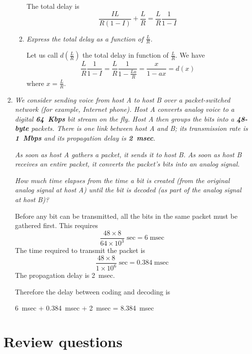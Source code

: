\documentclass[12pt,a4paper]{article}
\begin{document}
\begin{enumerate}
\begin{enumerate}
      The total delay is
      \[
        \frac{IL}{R(1-I)} + \frac{L}{R} = \frac{L}{R} \frac{1}{1-I}
      \]

      \item \emph{Express the total delay as a function of
        \(\frac{L}{R}\).}

      Let us call \(d (\frac{L}{R})\) the total delay in function of
      \(\frac{L}{R}\). We have
      \[
       \frac{L}{R} \frac{1}{1-I} = \frac{L}{R} \frac{1}{1 -
         \frac{La}{R}} = \frac{x}{1 - ax} = d (x)
      \]
      where \(x = \frac{L}{R}\).

    \end{enumerate}

  \item \emph{We consider sending voice from host A to host B over a
    packet-switched network (for example, Internet phone). Host A
    converts analog voice to a digital \textbf{64~Kbps} bit stream on
    the fly. Host A then groups the bits into a \textbf{48-byte}
    packets. There is one link between host A and B; its transmission
    rate is \textbf{1~Mbps} and its propagation delay is
    \textbf{2~msec}.}

    \emph{As soon as host A gathers a packet, it sends it to host
      B. As soon as host B receives an \emph{entire} packet, it
      converts the packet's bits into an analog signal.}

    \emph{How much time elapses from the time a bit is created (from
      the original analog signal at host A) until the bit is decoded
      (as part of the analog signal at host B)?}

    Before any bit can be transmitted, all the bits in the same packet
    must be gathered first. This requires
    \[
      \frac{48 \times 8}{64 \times 10^3} \; \text{sec} = 6 \;
      \text{msec}
    \]
    The time required to transmit the packet is
    \[
      \frac{48 \times 8}{1 \times 10^{6}} \; \text{sec} = 0.384 \;
      \text{msec}
    \]
    The propagation delay is 2~msec.

    Therefore the delay between coding and decoding is
    \begin{center}
      6~msec + 0.384~msec + 2~msec = 8.384~msec
    \end{center}

\end{enumerate}


\section{Review questions}
\end{document}

